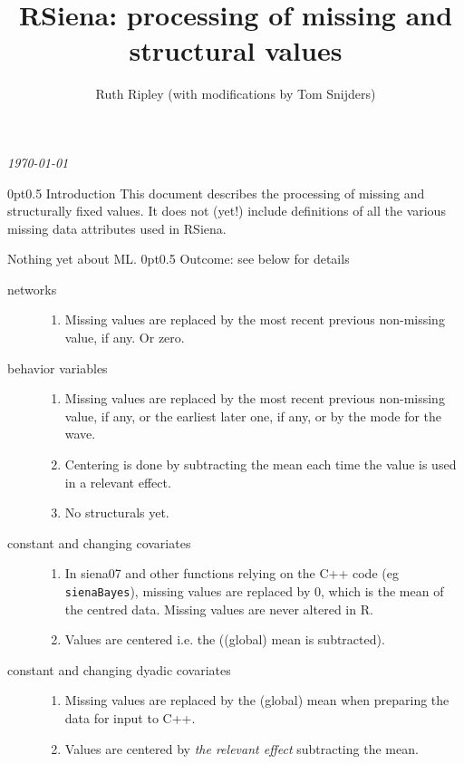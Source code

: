 \documentclass[12pt,a4paper]{article}
\makeatletter
\renewcommand{\=}{\,=\,}
\newcommand{\+}{\,+\,}
\renewcommand{\section}{\@startsection{section}{1}
                {0pt}{\baselineskip}{0.5\baselineskip}
                {\centering\sffamily} }
\makeatother
\begin{document}
\title{RSiena: processing of missing and structural values}
\author{Ruth Ripley (with modifications by Tom Snijders)}
\date{}
\maketitle

\centerline{\emph{\today}}
\bigskip
\section{Introduction}
This document describes the processing of missing and structurally fixed
values. It does not (yet!) include definitions of all the various missing data
attributes used in RSiena.

Nothing yet about ML.
\section{Outcome: see below for details}
\begin{description}
\item[networks]\hfill
\begin{enumerate}
\item Missing values are replaced by the most recent previous non-missing value,
  if any. Or zero.
\end{enumerate}
\item[behavior variables]\hfill
\begin{enumerate}
\item Missing values are replaced by the most recent previous non-missing value,
  if any, or the earliest later one, if any, or by the mode for the wave.
\item Centering is done by subtracting the mean each time the value is
  used in a relevant effect.
\item No structurals yet.
\end{enumerate}
\item[constant and changing covariates] \hfill
\begin{enumerate}
\item In siena07 and other functions relying on the C++ code (eg
  \verb|sienaBayes|), missing values are replaced by 0, which is the mean of the
  centred data. Missing values are never altered in R.
\item Values are centered i.e. the ((global) mean is
  subtracted).
\end{enumerate}
\item[constant and changing dyadic covariates]\hfill
\begin{enumerate}
\item Missing values are replaced by the (global) mean when preparing the data
  for input to C++.
\item Values are centered by \emph{the relevant effect} subtracting the mean.
\end{enumerate}
\end{description}
\end{document}
